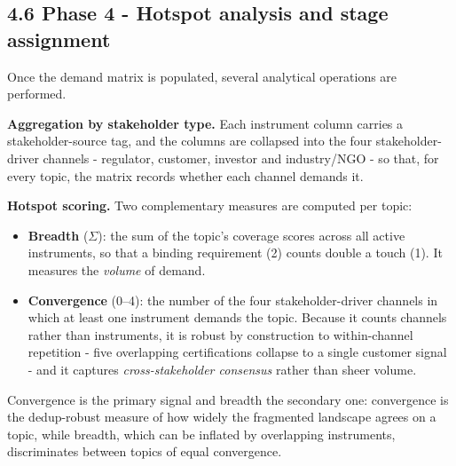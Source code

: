 \documentclass[
]{article}
\begin{document}

\subsection{4.6 Phase 4 - Hotspot analysis and stage
assignment}\label{phase-4---hotspot-analysis-and-stage-assignment}

Once the demand matrix is populated, several analytical operations are
performed.

\textbf{Aggregation by stakeholder type.} Each instrument column carries a
stakeholder-source tag, and the columns are collapsed into the four
stakeholder-driver channels - regulator, customer, investor and
industry/NGO - so that, for every topic, the matrix records whether each
channel demands it.

\textbf{Hotspot scoring.} Two complementary measures are computed per
topic:

\begin{itemize}
\item
  \textbf{Breadth} ($\Sigma$): the sum of the topic's coverage scores
  across all active instruments, so that a binding requirement (2) counts
  double a touch (1). It measures the \emph{volume} of demand.
\item
  \textbf{Convergence} (0--4): the number of the four stakeholder-driver
  channels in which at least one instrument demands the topic. Because it
  counts channels rather than instruments, it is robust by construction to
  within-channel repetition - five overlapping certifications collapse
  to a single customer signal - and it captures \emph{cross-stakeholder
  consensus} rather than sheer volume.
\end{itemize}

Convergence is the primary signal and breadth the secondary one:
convergence is the dedup-robust measure of how widely the fragmented
landscape agrees on a topic, while breadth, which can be inflated by
overlapping instruments, discriminates between topics of equal
convergence.
\end{document}
